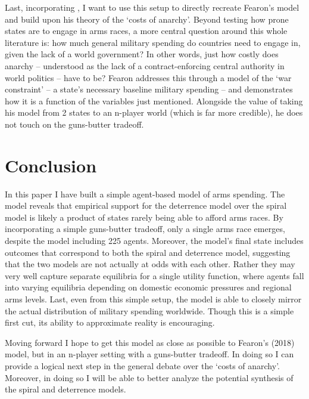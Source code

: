 \documentclass[12pt]{article}
\begin{document}
Last, incorporating \citet{fearon2018}, I want to use this setup to directly recreate Fearon's model and build upon his theory of the `costs of anarchy'. Beyond testing how prone states are to engage in arms races, a more central question around this whole literature is: how much general military spending do countries need to engage in, given the lack of a world government? In other words, just how costly does anarchy -- understood as the lack of a contract-enforcing central authority in world politics -- have to be? Fearon addresses this through a model of the `war constraint' -- a state's necessary baseline military spending -- and demonstrates how it is a function of the variables just mentioned. Alongside the value of taking his model from 2 states to an n-player world (which is far more credible), he does not touch on the guns-butter tradeoff.

\section{Conclusion}\label{conclusion}

In this paper I have built a simple agent-based model of arms spending. The model reveals that empirical support for the deterrence model over the spiral model is likely a product of states rarely being able to afford arms races. By incorporating a simple guns-butter tradeoff, only a single arms race emerges, despite the model including 225 agents. Moreover, the model's final state includes outcomes that correspond to both the spiral and deterrence model, suggesting that the two models are not actually at odds with each other. Rather they may very well capture separate equilibria for a single utility function, where agents fall into varying equilibria depending on domestic economic pressures and regional arms levels. Last, even from this simple setup, the model is able to closely mirror the actual distribution of military spending worldwide. Though this is a simple first cut, its ability to approximate reality is encouraging.

Moving forward I hope to get this model as close as possible to Fearon's (2018) model, but in an n-player setting with a guns-butter tradeoff. In doing so I can provide a logical next step in the general debate over the `costs of anarchy'. Moreover, in doing so I will be able to better analyze the potential synthesis of the spiral and deterrence models.

\singlespacing



\end{document}
